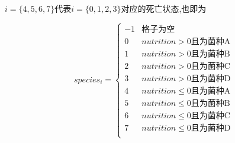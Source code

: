 \documentclass[12pt]{ctexart}
\begin{document}
$i=\{4,5,6,7\}$代表$i=\{0,1,2,3\}$对应的死亡状态,也即为

\[species_i=
\left \{
\begin{array}{ll}
    -1&\text{格子为空}\\
    0&nutrition>0 \text{且为菌种A}\\
    1&nutrition>0 \text{且为菌种B}\\
    2&nutrition>0 \text{且为菌种C}\\
    3&nutrition>0 \text{且为菌种D}\\
    4&nutrition\leqslant 0 \text{且为菌种A}\\
    5&nutrition\leqslant 0 \text{且为菌种B}\\
    6&nutrition\leqslant 0 \text{且为菌种C}\\
    7&nutrition\leqslant 0 \text{且为菌种D}\\
\end{array}
\right .
\]

\end{document}
